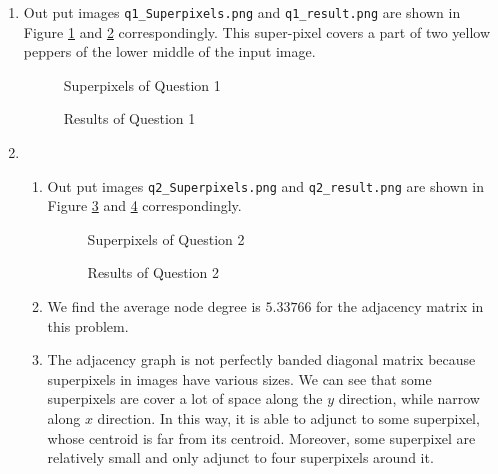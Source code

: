 \documentclass[12pt]{article}
\begin{document}
	\begin{enumerate}
		\item Out put images  \texttt{q1\_Superpixels.png} and \texttt{q1\_result.png} are shown in Figure \ref{fig:q1_1} and \ref{fig:q1_2} correspondingly. This super-pixel covers a part of two yellow peppers of the lower middle of the input image. 
		\begin{figure}[H]
			\centering{}
			\caption{Superpixels of Question 1}
			\label{fig:q1_1}
		\end{figure}
		\begin{figure}[H]
			\centering{}
			\caption{Results of Question 1}
			\label{fig:q1_2}
		\end{figure}
		
		
	\item
	\begin{enumerate}
		\item Out put images  \texttt{q2\_Superpixels.png} and \texttt{q2\_result.png} are shown in Figure \ref{fig:q2_1} and \ref{fig:q2_2} correspondingly.
		\begin{figure}[H]
			\centering{}
			\caption{Superpixels of Question 2}
			\label{fig:q2_1}
		\end{figure}
		\begin{figure}[H]
			\centering{}
			\caption{Results of Question 2}
			\label{fig:q2_2}
		\end{figure}
	
	\item We find the average node degree is $5.33766$ for the adjacency matrix in this problem.
	
	\item The adjacency graph is not perfectly banded diagonal matrix because superpixels in images have various sizes. We can see that some superpixels are cover a lot of space along the $y$ direction, while narrow along $x$ direction. In this way, it is able to adjunct to some superpixel, whose centroid is far from its centroid. Moreover, some superpixel are relatively small and only adjunct to four superpixels around it.  
	\end{enumerate}
	   

\end{enumerate}
\end{document}
